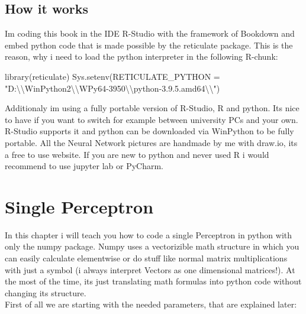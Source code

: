 \documentclass[
]{book}
\newenvironment{Shaded}{\begin{snugshade}}{\end{snugshade}}
\newcommand{\AttributeTok}[1]{\textcolor[rgb]{0.77,0.63,0.00}{#1}}
\newcommand{\FunctionTok}[1]{\textcolor[rgb]{0.00,0.00,0.00}{#1}}
\newcommand{\NormalTok}[1]{#1}
\newcommand{\SpecialCharTok}[1]{\textcolor[rgb]{0.00,0.00,0.00}{#1}}
\newcommand{\StringTok}[1]{\textcolor[rgb]{0.31,0.60,0.02}{#1}}
\begin{document}
\hypertarget{how-it-works}{%
\section{How it works}\label{how-it-works}}

Im coding this book in the IDE R-Studio with the framework of Bookdown and embed python code that is made possible by the reticulate package. This is the reason, why i need to load the python interpreter in the following R-chunk:

\begin{Shaded}
\begin{Highlighting}[]
\FunctionTok{library}\NormalTok{(reticulate)}
\FunctionTok{Sys.setenv}\NormalTok{(}\AttributeTok{RETICULATE\_PYTHON =} \StringTok{"D:}\SpecialCharTok{\textbackslash{}\textbackslash{}}\StringTok{WinPython2}\SpecialCharTok{\textbackslash{}\textbackslash{}}\StringTok{WPy64{-}3950}\SpecialCharTok{\textbackslash{}\textbackslash{}}\StringTok{python{-}3.9.5.amd64}\SpecialCharTok{\textbackslash{}\textbackslash{}}\StringTok{"}\NormalTok{)}
\end{Highlighting}
\end{Shaded}

Additionaly im using a fully portable version of R-Studio, R and python. Its nice to have if you want to switch for example between university PCs and your own. R-Studio supports it and python can be downloaded via WinPython to be fully portable. All the Neural Network pictures are handmade by me with draw.io, its a free to use website. If you are new to python and never used R i would recommend to use jupyter lab or PyCharm.

\hypertarget{single-perceptron}{%
\chapter{Single Perceptron}\label{single-perceptron}}

In this chapter i will teach you how to code a single Perceptron in python with only the numpy package. Numpy uses a vectorizible math structure in which you can easily calculate elementwise or do stuff like normal matrix multiplications with just a symbol (i always interpret Vectors as one dimensional matrices!). At the most of the time, its just translating math formulas into python code without changing its structure.\\
First of all we are starting with the needed parameters, that are explained later:
\end{document}
